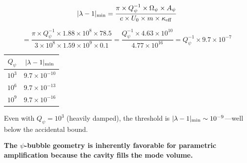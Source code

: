 \documentclass[12pt,letterpaper]{article}
\begin{document}
\begin{equation}
|\lambda - 1|_{\rm min} = \frac{\pi \times Q_\psi^{-1} \times \Omega_\psi \times A_\psi}{c \times U_0 \times m \times \kappa_{\rm eff}}
\end{equation}

\begin{equation}
= \frac{\pi \times Q_\psi^{-1} \times 1.88 \times 10^8 \times 78.5}{3 \times 10^8 \times 1.59 \times 10^9 \times 0.1}
= \frac{Q_\psi^{-1} \times 4.63 \times 10^{10}}{4.77 \times 10^{16}} = Q_\psi^{-1} \times 9.7 \times 10^{-7}
\end{equation}

\begin{center}
\begin{tabular}{cc}
\toprule
$Q_\psi$ & $|\lambda - 1|_{\rm min}$ \\
\midrule
$10^3$ & $9.7 \times 10^{-10}$ \\
$10^6$ & $9.7 \times 10^{-13}$ \\
$10^9$ & $9.7 \times 10^{-16}$ \\
\bottomrule
\end{tabular}
\end{center}

Even with $Q_\psi = 10^3$ (heavily damped), the threshold is $|\lambda - 1|_{\rm min} \sim 10^{-9}$---well below the accidental bound.

\textbf{The $\psi$-bubble geometry is inherently favorable for parametric amplification because the cavity fills the mode volume.}
\end{document}
